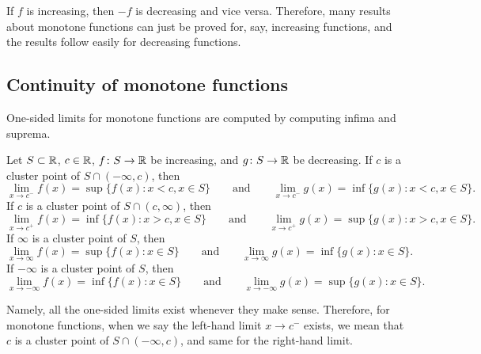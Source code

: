 If $f$ is increasing, then $-f$ is decreasing and vice versa.  Therefore,
many results about monotone functions can just be proved for, say, increasing
functions, and the results follow easily for decreasing functions.

\subsection{Continuity of monotone functions}

One-sided limits for monotone functions are computed
by computing infima and suprema.

\begin{prop} \label{prop:monotlimits}
Let $S \subset {\mathbb{R}}$, $c \in {\mathbb{R}}$,
$f \colon S \to {\mathbb{R}}$ be increasing,
and
$g \colon S \to {\mathbb{R}}$ be decreasing.
If $c$ is a cluster point of $S \cap (-\infty,c)$, then
\begin{equation*}
\lim_{x \to c^-} f(x) = \sup \{ f(x) : x < c, x \in S \}
\qquad \text{and} \qquad
\lim_{x \to c^-} g(x) = \inf \{ g(x) : x < c, x \in S \} .
\end{equation*}
If $c$ is a cluster point of $S \cap (c,\infty)$, then
\begin{equation*}
\lim_{x \to c^+} f(x) = \inf \{ f(x) : x > c, x \in S \}
\qquad \text{and} \qquad
\lim_{x \to c^+} g(x) = \sup \{ g(x) : x > c, x \in S \} .
\end{equation*}
If $\infty$ is a cluster point of $S$, then
\begin{equation*}
\lim_{x \to \infty} f(x) = \sup \{ f(x) : x \in S \}
\qquad \text{and} \qquad
\lim_{x \to \infty} g(x) = \inf \{ g(x) : x \in S \} .
\end{equation*}
If $-\infty$ is a cluster point of $S$, then
\begin{equation*}
\lim_{x \to -\infty} f(x) = \inf \{ f(x) : x \in S \}
\qquad \text{and} \qquad
\lim_{x \to -\infty} g(x) = \sup \{ g(x) : x \in S \} .
\end{equation*}
\end{prop}

Namely, all the one-sided limits exist whenever they make
sense.  Therefore, for monotone functions, when we say
the left-hand limit $x \to c^-$
exists, we mean that $c$ is a cluster point of $S \cap (-\infty,c)$,
and same for the right-hand limit.


